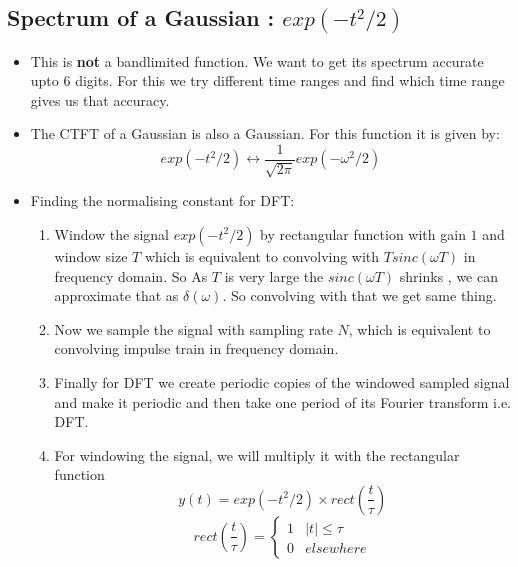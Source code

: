\documentclass[11pt, a4paper]{article}
\begin{document}
    \subsection{Spectrum of a Gaussian : $exp(-t^2/2)$}
    \begin{itemize}
        \item This is \textbf{not} a bandlimited function. We want to get its spectrum accurate upto $6$ digits. For this we try different time ranges and find which time range gives us that accuracy.
        \item The CTFT of a Gaussian is also a Gaussian. For this function it is given by:
            \begin{equation}
                exp(-t^2/2) \longleftrightarrow \frac{1}{\sqrt{2\pi}} exp(-\omega^2/2)
            \end{equation}
        \item Finding the normalising constant for DFT:
            \begin{enumerate}
                \item Window the signal $exp(-t^2/2)$ by rectangular function with gain $1$ and window size $T$ which is equivalent to convolving with $Tsinc(\omega T)$ in frequency domain. So As $T$ is very large the $sinc(\omega T)$ shrinks , we can approximate that as $\delta(\omega)$. So convolving with that we get same thing.
                \item Now we sample the signal with sampling rate $N$, which is equivalent to convolving impulse train in frequency domain.
                \item Finally for DFT we create periodic copies of the windowed sampled signal and make it periodic and then take one period of its Fourier transform i.e. DFT.
                \item For windowing the signal, we will multiply it with the rectangular function
                    \begin{equation*}
                        y(t) = exp(-t^2/2) \times rect(\frac{t}{\tau}) 
                    \end{equation*}
                    \begin{equation*}
                        rect(\frac{t}{\tau}) = 
                        \begin{cases}
                            1 & \lvert{t}\rvert \leq \tau \\
                            0 & elsewhere
                        \end{cases}
                    \end{equation*}

\end{enumerate}
\end{itemize}
\end{document}
